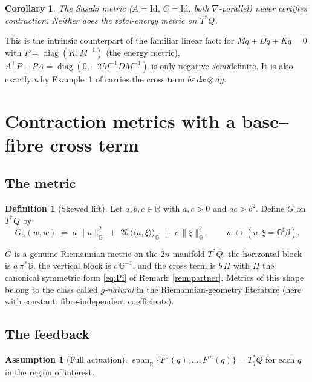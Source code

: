 \documentclass[11pt,a4paper]{article}
\newcommand{\Gm}{\mathbb{G}}                      %
\newcommand{\Rm}{\mathbb{R}}
\newcommand{\ipG}[2]{\langle\!\langle #1 , #2 \rangle\!\rangle_{\Gm}}
\newcommand{\Gsharp}{\Gm^{\sharp}}
\newcommand{\id}{\mathrm{Id}}
\newcommand{\normG}[1]{\lVert #1 \rVert_{\Gm}}
\newcommand{\Tstar}{T^{*}Q}
\theoremstyle{plain}
\newtheorem{corollary}[theorem]{Corollary}
\theoremstyle{definition}
\newtheorem{definition}[theorem]{Definition}
\newtheorem{assumption}[theorem]{Assumption}
\theoremstyle{remark}
\begin{document}
\begin{corollary}
The Sasaki metric ($A = \id$, $C = \id$, both $\nabla$-parallel) never certifies
contraction. Neither does the total-energy metric on $\Tstar$.
\end{corollary}

This is the intrinsic counterpart of the familiar linear fact: for
$M\ddot q + D\dot q + Kq = 0$ with $P = \operatorname{diag}(K, M^{-1})$ (the energy
metric), $A^{\!\top}P + PA = \operatorname{diag}(0, -2M^{-1}DM^{-1})$ is only
negative \emph{semi}definite. It is also exactly why Example~1 of \cite{SB13}
carries the cross term $b\varepsilon\,dx\otimes dy$.

\section{Contraction metrics with a base--fibre cross term}
\label{sec:main}

\subsection{The metric}

\begin{definition}[Skewed lift]
\label{def:metric}
Let $a,b,c \in \Rm$ with $a,c>0$ and $ac > b^2$. Define $G$ on $\Tstar$ by
\begin{equation}
  G_\alpha(w,w) \;=\; a\,\normG{u}^2 \;+\; 2b\,\ipG{u}{\xi} \;+\; c\,\normG{\xi}^2,
  \qquad w \leftrightarrow (u,\xi = \Gsharp\beta).
  \label{eq:G}
\end{equation}
\end{definition}

$G$ is a genuine Riemannian metric on the $2n$-manifold $\Tstar$: the horizontal
block is $a\,\pi^{*}\Gm$, the vertical block is $c\,\Gm^{-1}$, and the cross term
is $b\,\Pi$ with $\Pi$ the canonical symmetric form \eqref{eq:Pi} of
Remark~\ref{rem:partner}. Metrics of this shape belong to the class called
\emph{$g$-natural} in the Riemannian-geometry literature (here with constant,
fibre-independent coefficients).

\subsection{The feedback}

\begin{assumption}[Full actuation]
\label{ass:actuation}
$\operatorname{span}_{\Rm}\{F^1(q),\dots,F^m(q)\} = T^{*}_qQ$ for each $q$ in the
region of interest.
\end{assumption}
\end{document}
